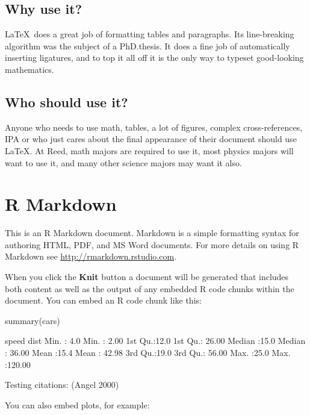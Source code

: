 \documentclass[12pt,twoside]{reedthesis}
\begin{document}
  \section{Why use it?}

  \LaTeX~does a great job of formatting tables and paragraphs. Its
  line-breaking algorithm was the subject of a PhD.\thinspace thesis. It
  does a fine job of automatically inserting ligatures, and to top it all
  off it is the only way to typeset good-looking mathematics.

  \section{Who should use it?}

  Anyone who needs to use math, tables, a lot of figures, complex
  cross-references, IPA or who just cares about the final appearance of
  their document should use \LaTeX. At Reed, math majors are required to
  use it, most physics majors will want to use it, and many other science
  majors may want it also.

  \chapter{R Markdown}

  This is an R Markdown document. Markdown is a simple formatting syntax
  for authoring HTML, PDF, and MS Word documents. For more details on
  using R Markdown see \url{http://rmarkdown.rstudio.com}.

  When you click the \textbf{Knit} button a document will be generated
  that includes both content as well as the output of any embedded R code
  chunks within the document. You can embed an R code chunk like this:

  \begin{CodeChunk}
  \begin{CodeInput}
  summary(cars)
  \end{CodeInput}
  \begin{CodeOutput}
       speed           dist
   Min.   : 4.0   Min.   :  2.00
   1st Qu.:12.0   1st Qu.: 26.00
   Median :15.0   Median : 36.00
   Mean   :15.4   Mean   : 42.98
   3rd Qu.:19.0   3rd Qu.: 56.00
   Max.   :25.0   Max.   :120.00
  \end{CodeOutput}
  \end{CodeChunk}

  Testing citations: (Angel 2000)

  You can also embed plots, for example:
\end{document}
